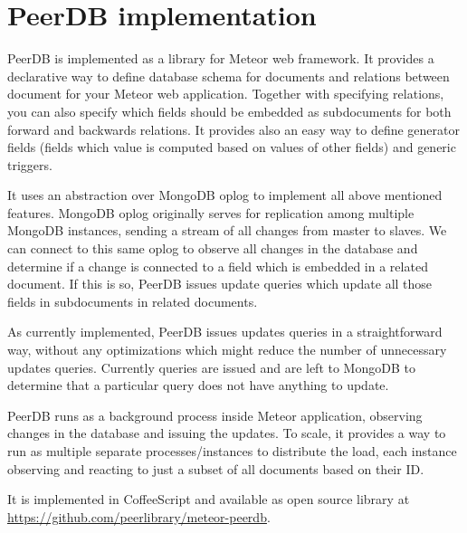 \section{PeerDB implementation}

PeerDB is implemented as a library for Meteor web framework.
It provides a declarative way to define database schema for documents and relations between document for your Meteor web application.
Together with specifying relations, you can also specify which fields should be embedded as subdocuments for both forward and backwards relations.
It provides also an easy way to define generator fields (fields which value is computed based on values of other fields) and generic triggers.

It uses an abstraction over MongoDB oplog to implement all above mentioned features.
MongoDB oplog originally serves for replication among multiple MongoDB instances, sending a stream of all changes from master to slaves.
We can connect to this same oplog to observe all changes in the database and determine if a change is connected to a field which is embedded in a related document.
If this is so, PeerDB issues update queries which update all those fields in subdocuments in related documents.

As currently implemented, PeerDB issues updates queries in a straightforward way, without any optimizations which might reduce the number of unnecessary updates queries.
Currently queries are issued and are left to MongoDB to determine that a particular query does not have anything to update.

PeerDB runs as a background process inside Meteor application, observing changes in the database and issuing the updates.
To scale, it provides a way to run as multiple separate processes/instances to distribute the load, each instance observing and reacting to just a subset of all documents based on their ID.

It is implemented in CoffeeScript and available as open source library at \url{https://github.com/peerlibrary/meteor-peerdb}.